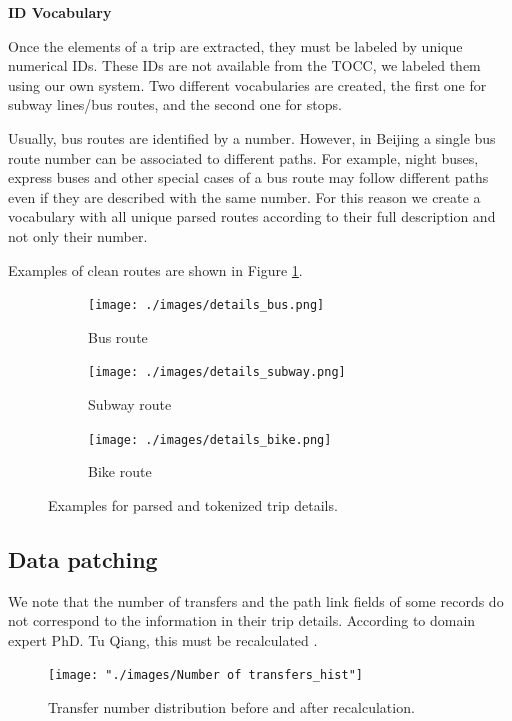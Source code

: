 \documentclass{article}
\begin{document}
\textbf{ID Vocabulary}

Once the elements of a trip are extracted, they must be labeled by unique numerical IDs. These IDs are not available from the TOCC, we labeled them using our own system. Two different vocabularies are created, the first one for subway lines/bus routes, and the second one for stops. 

Usually, bus routes are identified by a number. However, in Beijing a single bus route number can be associated to different paths. For example, night buses, express buses and other special cases of a bus route may follow different paths even if they are described with the same number. For this reason we create a vocabulary with all unique parsed routes according to their full description and not only their number.  

Examples of clean routes are shown in Figure \ref{fig:preprocessing/parsed_routes}. %

\begin{figure}[H]
  \centering
  \begin{subfigure}[b]{.8\textwidth}
  	\centering
  	\texttt{[image: ./images/details\_bus.png]}
  	\caption{Bus route}
  \end{subfigure}
  \begin{subfigure}[b]{.8\textwidth}
  	\centering
  	\texttt{[image: ./images/details\_subway.png]}
  	\caption{Subway route}
  \end{subfigure}
    \begin{subfigure}[b]{.8\textwidth}
  	\centering
  	\texttt{[image: ./images/details\_bike.png]}
  	\caption{Bike route}
  \end{subfigure}
  \caption{Examples for parsed and tokenized trip details.}
  	\label{fig:preprocessing/parsed_routes}
\end{figure}

\subsection{Data patching}
\label{sec:patching}
We note that the number of transfers and the path link fields of some records do not correspond to the information in their trip details. According to domain expert PhD. Tu Qiang, this must be recalculated \cite{tommy}. 

\begin{figure}[H]
  \centering
  \texttt{[image: "./images/Number of transfers\_hist"]}
  \caption{Transfer number distribution before and after recalculation.}
  \label{fig:preprocessing/num_transfers}
\end{figure}
\end{document}
